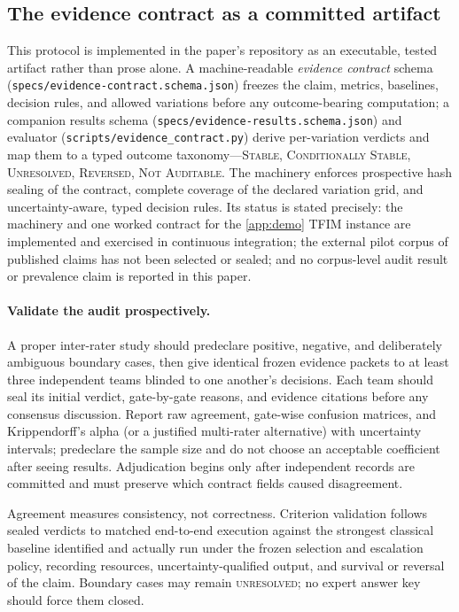 \subsection{The evidence contract as a committed artifact}

This protocol is implemented in the paper's repository as an executable, tested artifact rather than prose alone. A machine-readable \emph{evidence contract} schema (\texttt{specs/evidence-contract.schema.json}) freezes the claim, metrics, baselines, decision rules, and allowed variations before any outcome-bearing computation; a companion results schema (\texttt{specs/evidence-results.schema.json}) and evaluator (\texttt{scripts/evidence\_contract.py}) derive per-variation verdicts and map them to a typed outcome taxonomy---\textsc{Stable}, \textsc{Conditionally Stable}, \textsc{Unresolved}, \textsc{Reversed}, \textsc{Not Auditable}. The machinery enforces prospective hash sealing of the contract, complete coverage of the declared variation grid, and uncertainty-aware, typed decision rules. Its status is stated precisely: the machinery and one worked contract for the \cref{app:demo} TFIM instance are implemented and exercised in continuous integration; the external pilot corpus of published claims has not been selected or sealed; and no corpus-level audit result or prevalence claim is reported in this paper.

\paragraph{Validate the audit prospectively.}

A proper inter-rater study should predeclare positive, negative, and deliberately ambiguous boundary cases, then give identical frozen evidence packets to at least three independent teams blinded to one another's decisions. Each team should seal its initial verdict, gate-by-gate reasons, and evidence citations before any consensus discussion. Report raw agreement, gate-wise confusion matrices, and Krippendorff's alpha (or a justified multi-rater alternative) with uncertainty intervals; predeclare the sample size and do not choose an acceptable coefficient after seeing results. Adjudication begins only after independent records are committed and must preserve which contract fields caused disagreement.

Agreement measures consistency, not correctness. Criterion validation follows sealed verdicts to matched end-to-end execution against the strongest classical baseline identified and actually run under the frozen selection and escalation policy, recording resources, uncertainty-qualified output, and survival or reversal of the claim. Boundary cases may remain \textsc{unresolved}; no expert answer key should force them closed.
